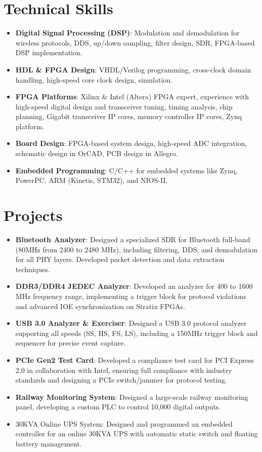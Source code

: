 \documentclass[10pt, a4paper]{article}
\begin{document}
\section{Technical Skills}

\begin{itemize}
    \item \textbf{Digital Signal Processing (DSP)}: Modulation and demodulation for wireless protocols, DDS, up/down sampling, filter design, SDR, FPGA-based DSP implementation.
    \item \textbf{HDL \& FPGA Design}: VHDL/Verilog programming, cross-clock domain handling, high-speed core clock design, simulation. 
    \item \textbf{FPGA Platforms}: Xilinx \& Intel (Altera) FPGA expert, experience with high-speed digital design and transceiver tuning, timing analysis, chip planning, Gigabit transceiver IP cores, memory controller IP cores, Zynq platform.
    \item \textbf{Board Design}: FPGA-based system design, high-speed ADC integration, schematic design in OrCAD, PCB design in Allegro.
    \item \textbf{Embedded Programming}: C/C++ for embedded systems like Zynq, PowerPC, ARM (Kinetis, STM32), and NIOS-II.
\end{itemize}

\section{Projects}
\begin{itemize}
    \item \textbf{Bluetooth Analyzer}: Designed a specialized SDR for Bluetooth full-band (80MHz from 2400 to 2480 MHz), including filtering, DDS, and demodulation for all PHY layers. Developed packet detection and data extraction techniques.
    \item \textbf{DDR3/DDR4 JEDEC Analyzer}: Developed an analyzer for 400 to 1600 MHz frequency range, implementing a trigger block for protocol violations and advanced IOE synchronization on Stratix FPGAs.
    \item \textbf{USB 3.0 Analyzer \& Exerciser}: Designed a USB 3.0 protocol analyzer supporting all speeds (SS, HS, FS, LS), including a 150MHz trigger block and sequencer for precise event capture.
    \item \textbf{PCIe Gen2 Test Card}: Developed a compliance test card for PCI Express 2.0 in collaboration with Intel, ensuring full compliance with industry standards and designing a PCIe switch/jammer for protocol testing.
    \item \textbf{Railway Monitoring System}: Designed a large-scale railway monitoring panel, developing a custom PLC to control 10,000 digital outputs. 
    \item 30KVA Online UPS System: Designed and programmed an embedded controller for an online 30KVA UPS with automatic static switch and floating battery management. 
\end{itemize}
\end{document}
